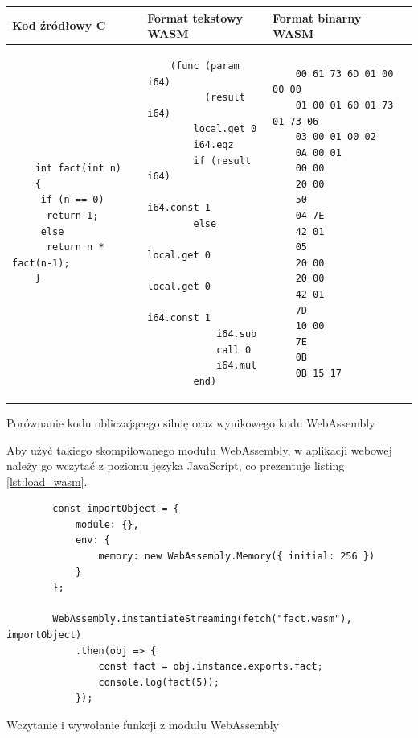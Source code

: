 \documentclass[language=polish,type=master]{aghmodern}
\begin{document}
\begin{listing}[H]
    \begin{center}
        \begin{tabular}{ |p{}|p{}|p{}| }

            \hline
            Kod źródłowy C & Format tekstowy WASM & Format binarny WASM \\
            \hline

            \begin{verbatim}
    int fact(int n)
    {
     if (n == 0)
      return 1;
     else
      return n * fact(n-1);
    }
\end{verbatim}

                           &

            \begin{verbatim}
    (func (param i64)
          (result i64)
        local.get 0
        i64.eqz
        if (result i64)
            i64.const 1
        else
            local.get 0
            local.get 0
            i64.const 1
            i64.sub
            call 0
            i64.mul
        end)
\end{verbatim}

                           &

            \begin{verbatim}
    00 61 73 6D 01 00 00 00
    01 00 01 60 01 73 01 73 06
    03 00 01 00 02
    0A 00 01
    00 00
    20 00
    50
    04 7E
    42 01
    05
    20 00
    20 00
    42 01
    7D
    10 00
    7E
    0B
    0B 15 17
\end{verbatim}

            \\

            \hline
        \end{tabular}
    \end{center}

    \caption{Porównanie kodu obliczającego silnię oraz wynikowego kodu WebAssembly}
    \label{lst:wasm}

\end{listing}

Aby użyć takiego skompilowanego modułu WebAssembly, w aplikacji webowej należy go wczytać z poziomu języka JavaScript, co prezentuje listing \ref{lst:load_wasm}.

\begin{listing}[H]
    \begin{verbatim}
        const importObject = {
            module: {},
            env: {
                memory: new WebAssembly.Memory({ initial: 256 })
            }
        };

        WebAssembly.instantiateStreaming(fetch("fact.wasm"), importObject)
            .then(obj => {
                const fact = obj.instance.exports.fact;
                console.log(fact(5));
            });
    \end{verbatim}
    \caption{Wczytanie i wywołanie funkcji z modułu WebAssembly}
    \label{lst:load_wasm}
\end{listing}
\end{document}
